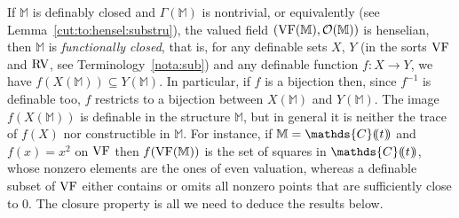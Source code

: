 \documentclass[12pt]{amsart}
\newcommand{\memph}[1]{{\color{magenta}\emph{#1}}}
\theoremstyle{plain}
\theoremstyle{definition}
\newtheorem{defn}[thm]{Definition}
\theoremstyle{remark}
\numberwithin{equation}{section}
\theoremstyle{plain}
\newcommand{\VF}{\textup{VF}}
\newcommand{\RV}{\textup{RV}}
\newcommand{\OO}{\mdl O}
\newcommand{\C}{\mathds{C}}
\newcommand{\gR}{\mathfrak{R}}
\newcommand{\0}{\emptyset}
\newcommand{\dpar}[1]{%
   (\mkern-4mu (#1 )\mkern-4mu )}
\newcommand{\mdl}[1]{\mathcal{#1}}  %
\newcommand{\rest}{\upharpoonright}
\newcommand{\fun}{\longrightarrow}
\newcommand{\sub}{\subseteq}
\newcommand{\mgRV}{{\mu}{\RV}}
\newcommand{\mG}{{\mu}{\Gamma}}
\newcommand{\RES}{\textup{RES}}
\newcommand{\mgRES}{{\mu}{\RES}}
\DeclareMathOperator{\gsk}{\mathbf{K}_+}
\begin{document}
If $\mathbb{M}$ is definably closed and $\Gamma(\mathbb{M})$ is nontrivial, or equivalently (see Lemma~\ref{cut:to:hensel:substru}), the valued field $(\VF(\mathbb{M}), \OO(\mathbb{M}))$  is henselian, then $\mathbb{M}$ is \memph{functionally closed}, that is, for any definable sets $X$, $Y$ (in the sorts $\VF$ and $\RV$, see Terminology~\ref{nota:sub}) and any definable function $f : X \fun Y$, we have $f(X(\mathbb{M})) \sub Y(\mathbb{M})$. In particular, if $f$ is a bijection then, since $f^{-1}$ is definable too, $f$ restricts to a bijection between $X(\mathbb{M})$ and $Y(\mathbb{M})$. The image $f(X(\mathbb{M}))$ is definable in the structure $\mathbb{M}$, but in general it is neither the trace of $f(X)$ nor constructible in $\mathbb{M}$. For instance, if $\mathbb{M} = \C \dpar t$ and $f(x) = x^2$ on $\VF$ then $f(\VF(\mathbb{M}))$ is the set of squares in $\C \dpar t$, whose nonzero elements are the ones of even valuation, whereas a definable subset of $\VF$ either contains or omits all nonzero points that are sufficiently close to $0$. The closure property is all we need to deduce the results below.


%
%
%
%
%
\end{document}
